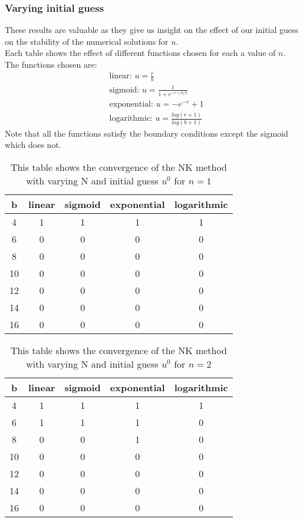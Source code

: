 \documentclass{article}
\begin{document}
\subsubsection{Varying initial guess}
These results are valuable as they give us insight on the effect of our initial guess on the stability of the numerical solutions for $u$. \\
Each table shows the effect of different functions chosen for each a value of $n$. The functions chosen are:
\begin{align*}
&\text{linear: } u = \frac{r}{b}  \\
&\text{sigmoid: } u = \frac{1}{1+e^{-r + b/2}} \\
&\text{exponential: } u = -e^{-r} + 1 \\
&\text{logarithmic: } u = \frac{log(r+1)}{log(b+1)} 
\end{align*}
Note that all the functions satisfy the boundary conditions except the sigmoid which does not. 
\begin{table}[H]
\centering
\begin{tabular}{|c|c|c|c|c|}
\hline
b                                          & linear  & sigmoid & exponential & logarithmic \\
\hline
4  & 1 & 1 & 1 & 1\\
6  & 0 & 0 & 0 & 0\\
8  & 0 & 0 & 0 & 0 \\
10 & 0 & 0 & 0 & 0 \\
12 & 0 & 0 & 0 & 0 \\
14 & 0 & 0 & 0 & 0 \\
16 & 0 & 0 & 0 & 0 \\
\hline
\end{tabular}
\caption{This table shows the convergence of the NK method with varying N and initial guess $u^0$ for $n=1$}
\end{table}
\begin{table}[H]
\centering
\begin{tabular}{|c|c|c|c|c|}
\hline
b                                          & linear  & sigmoid & exponential & logarithmic \\
\hline
4                                          & 1 & 1 & 1 &1\\
6                                          & 1 & 1 & 1 &0\\
8                                          & 0 & 0 & 1 &0\\
10                                         & 0 & 0 & 0 &0\\
12                                         & 0 & 0 & 0 &0\\
14                                         & 0 & 0 & 0 &0\\
16                                         & 0 & 0 & 0 &0\\
\hline
\end{tabular}
\caption{This table shows the convergence of the NK method with varying N and initial guess $u^0$ for $n=2$}
\end{table}
\end{document}
